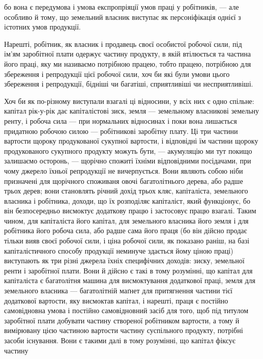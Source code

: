 \parcont{}  %
бо вона є передумова і умова експропріяції умов праці у робітників, — але
особливо й тому, що земельний власник виступає як персоніфікація однієї з
істотних умов продукції.

Нарешті, робітник, як власник і продавець своєї особистої робочої сили,
під ім’ям заробітної плати одержує частину продукту, в якій втілюється та
частина його праці, яку ми називаємо потрібною працею, тобто працею, потрібною
для збереження і репродукції цієї робочої сили, хоч би які були умови
цього збереження і репродукції, бідніші чи багатіші, сприятливіші чи несприятливіші.

Хоч би як по-різному виступали взагалі ці відносини, у всіх них є одно
спільне: капітал рік-у-рік дає капіталістові зиск, земля — земельному власникові
земельну ренту, і робоча сила — при нормальних відносинах і поки
вона лишається придатною робочою силою — робітникові заробітну плату.
Ці три частини вартости щороку продукованої сукупної вартости, і відповідні
їм частини щороку продукованого сукупного продукту можуть бути, — акумуляцію
ми тут покищо залишаємо осторонь, — щорічно спожиті їхніми відповідними
посідачами, при чому джерело їхньої репродукції не вичерпується. Вони являють
собою ніби призначені для щорічного споживаня овочі багатолітнього дерева, або
радше трьох дерев; вони становлять річний дохід трьох кляс, капіталіста, земельного
власника і робітника, доходи, що їх розподіляє капіталіст, який функціонує,
бо він безпосередньо висмоктує додаткову працю і застосовує працю взагалі.
Таким чином, для капіталіста його капітал, для земельного власника його земля
і для робітника його робоча сила, або радше сама його праця (бо він дійсно
продає тільки вияв своєї робочої сили, і ціна робочої сили, як показано раніш,
на базі капіталістичного способу продукції неминуче здається йому ціною праці)
виступають як три різні джерела їхніх специфічних доходів: зиску, земельної
ренти і заробітної плати. Вони й дійсно є такі в тому розумінні, що капітал
для капіталіста є багатолітня машина для висмоктування додаткової праці,
земля для земельного власника — багатолітній маґнет для притягнення частини
тієї додаткової вартости, яку висмоктав капітал, і нарешті, праця є постійно
самовідновна умова і постійно самовідновний засіб для того, щоб під титулом
заробітної плати добувати частину створеної робітником вартости, а тому й вимірювану
цією частиною вартости частину суспільного продукту, потрібні засоби
існування. Вони є такими далі в тому розумінні, що капітал фіксує частину
